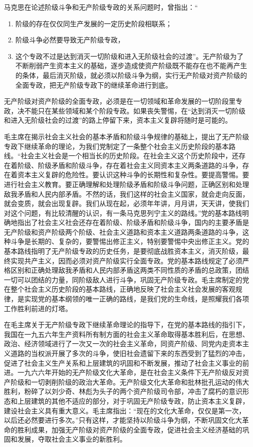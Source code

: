 \documentclass{book}
\begin{document}
马克思在论述阶级斗争和无产阶级专政的关系问题时，曾指出：“

\begin{enumerate}

\item 阶级的存在仅仅同生产发展的一定历史阶段相联系；
\item 阶级斗争必然要导致无产阶级专政，
\item 这个专政不过是达到消灭一切阶级和进入无阶级社会的过渡”。无产阶级为了不断削弱产生资本主义的基础，逐步造成使资产阶级既不能存在也不能再产生的条体，最后消灭阶级，就必须以阶级斗争为纲，实行无产阶级对资产阶级的全面专政，把无产阶级专政下的继续革命进行到底。

\end{enumerate}

无产阶级对资产阶级的全面专政，必须是在一切领域和革命发展的一切阶段里专政，决不能只在某些领域和某个阶段专政。如果丧失警惕，在“达到消灭一切阶级和进入无阶级社会的过渡”的路上停留下来，资本主义复辟将随时是可能的。

毛主席在揭示社会主义社会的基本矛盾和阶级斗争规律的基础上，提出了无产阶级专政下继续革命的理论，为我们党制定了一条整个社会主义历史阶段的基本路线。“社会主义社会是一个相当长的历史阶段。在社会主义这个历史阶段中，还存在着阶级、阶级矛盾和阶级斗争，存在着社会主义同资本主义两条道路的斗争，存在着资本主义复辟的危险性。要认识这种斗争的长期性和复杂性。要提高警惕。要进行社会主义教育。要正确理解和处理阶级矛盾和阶级斗争问题，正确区别和处理敌我矛盾和人民内部矛盾。不然的话，我们这样的社会主义国家，就会走向反面，就会变质，就会出现复辟。我们从现在起，必须年年讲，月月讲，天天讲，使我们对这个问题，有比较清醒的认识，有一条马克思列宁主义的路线。”党的基本路线明确地指出了社会主义社会还存在着阶级、阶级矛盾和阶级斗争，国内的主要矛盾是无产阶级和资产阶级两个阶级、社会主义道路和资本主义道路两条道路的斗争，这种斗争是长期的、复杂的，要警惕出修正主义，特别要警惕中央出修正主义。党的基本路线指明了无产阶级专政的历史任务，是要彻底战胜资本主义，消灭阶级，最终实现共产主义，因而必须对资产阶级实行全面专政。党的基本路线规定了必须严格区别和正确处理敌我矛盾和人民内部矛盾这两类不同性质的矛盾的总政策，团结一切可以团结的力量，同阶级敌人进行斗争，巩固无产阶级专政。毛主席制定的党在整个社会主义历史阶段的基本路线，正确地反映了社会主义社会发展的客观规律，是实现党的基本纲领的唯一正确的路线，是我们党的生命线，是照耀我们各项工作胜利前进的灯塔。

在毛主席关于无产阶级专政下继续革命理论的指导下，在党的基本路线的指引下，我国在一九五六年生产资料所有制方面的社会主义革命取得基本胜利后，在思想、政治、经济领域进行了一次又一次的社会主义革命，同资产阶级、同党内走资本主义道路的当权派开展了多次的斗争，使旧社会遗留下来的东西受到了猛烈的冲击，促进了社会主义生产关系和上层建筑的巩固和不断发展，推动了社会主义事业的前进。一九六六年开始的无产阶级文化大革命，是在社会主义条件下无产阶级反对资产阶级和一切剥削阶级的政治大革命。无产阶级文化大革命和批林批孔运动的伟大胜利，粉碎了以刘少奇、林彪为头子的两个资产阶级司令部，冲击了腐朽的意识形态和上层建筑的其他不适应的部分，对于巩固无产阶级专政，防止资本主义复辟，建设社会主义具有重大意义。毛主席指出：“现在的文化大革命，仅仅是第一次，以后还必然要进行多次。”只有这样，才能坚持以阶级斗争为纲，不断巩固文化大革命的胜利成果，加强无产阶级对资产阶级的全面专政，促进社会主义经济基础的巩固和发展，夺取社会主义事业的新胜利。
\end{document}
